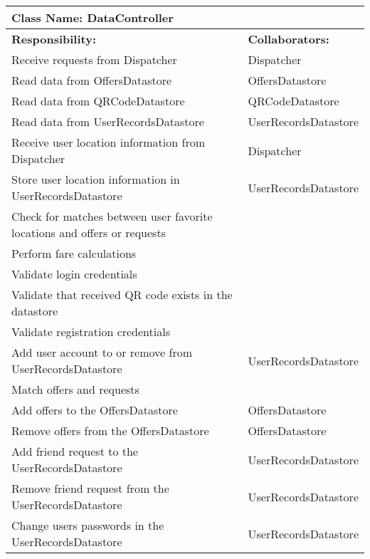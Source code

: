 \documentclass[english]{article}
\begin{document}
    \begin{table}[!ht]
        \centering
        \begin{tabular}{|p{8cm}|p{4cm}|}
        \hline 
        \multicolumn{2}{|l|}{\textbf{Class Name: DataController}} \\
        \hline
        \textbf{Responsibility:} & \textbf{Collaborators:} \\
        \hline
        Receive requests from Dispatcher & Dispatcher\\
        \hline
        Read data from OffersDatastore & OffersDatastore\\
        \hline
        Read data from QRCodeDatastore & QRCodeDatastore\\
        \hline
        Read data from UserRecordsDatastore & UserRecordsDatastore \\
        \hline
        Receive user location information from Dispatcher & Dispatcher  \\
        \hline
        Store user location information in UserRecordsDatastore & UserRecordsDatastore  \\
        \hline
        Check for matches between user favorite locations and offers or requests &  \\
        \hline
        Perform fare calculations &  \\
        \hline
        Validate login credentials &  \\
        \hline
        Validate that received QR code exists in the datastore &  \\
        \hline
        Validate registration credentials &  \\
        \hline
        Add user account to or remove from UserRecordsDatastore &  UserRecordsDatastore\\
        \hline
        Match offers and requests &  \\
        \hline
        Add offers to the OffersDatastore &  OffersDatastore\\
        \hline
        Remove offers from the OffersDatastore &  OffersDatastore\\
        \hline
        Add friend request to the UserRecordsDatastore  &  UserRecordsDatastore\\
        \hline
        Remove friend request from the UserRecordsDatastore  &  UserRecordsDatastore\\
        \hline
        Change users passwords in the UserRecordsDatastore  &  UserRecordsDatastore\\

\end{tabular}
\end{table}
\end{document}
